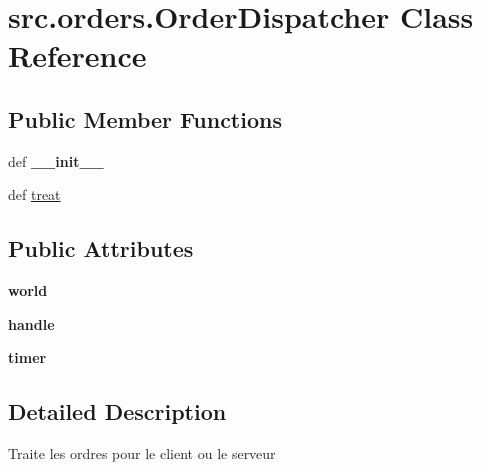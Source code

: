 \hypertarget{classsrc_1_1orders_1_1_order_dispatcher}{\section{src.\-orders.\-Order\-Dispatcher \-Class \-Reference}
\label{classsrc_1_1orders_1_1_order_dispatcher}
}
\subsection*{\-Public \-Member \-Functions}
\begin{DoxyCompactItemize}
\item 
\hypertarget{classsrc_1_1orders_1_1_order_dispatcher_a72be66c7756e667e0f48da3feb526db8}{def {\bfseries \-\_\-\-\_\-init\-\_\-\-\_\-}}\label{classsrc_1_1orders_1_1_order_dispatcher_a72be66c7756e667e0f48da3feb526db8}

\item 
def \hyperlink{classsrc_1_1orders_1_1_order_dispatcher_af7e1d2ad1021e105f8a810e45163a2a6}{treat}
\end{DoxyCompactItemize}
\subsection*{\-Public \-Attributes}
\begin{DoxyCompactItemize}
\item 
\hypertarget{classsrc_1_1orders_1_1_order_dispatcher_a3e1eb5983064b2b581cfbe29e5d8d4a4}{{\bfseries world}}\label{classsrc_1_1orders_1_1_order_dispatcher_a3e1eb5983064b2b581cfbe29e5d8d4a4}

\item 
\hypertarget{classsrc_1_1orders_1_1_order_dispatcher_af3a628629fdbcc412086c3a2ad36263f}{{\bfseries handle}}\label{classsrc_1_1orders_1_1_order_dispatcher_af3a628629fdbcc412086c3a2ad36263f}

\item 
\hypertarget{classsrc_1_1orders_1_1_order_dispatcher_a874829894f821dcf4229f015dc033773}{{\bfseries timer}}\label{classsrc_1_1orders_1_1_order_dispatcher_a874829894f821dcf4229f015dc033773}

\end{DoxyCompactItemize}


\subsection{\-Detailed \-Description}
\begin{DoxyVerb}Traite les ordres pour le client ou le serveur \end{DoxyVerb}
 

